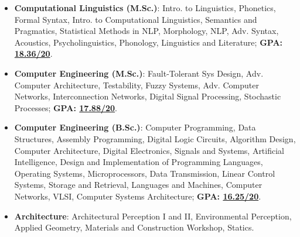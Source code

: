 \documentclass[10pt,a4paper,ragged2e]{altacv}
\begin{document}
    \begin{itemize}
        \item {\textbf{Computational Linguistics (M.Sc.)}: {Intro. to Linguistics, Phonetics, Formal Syntax, Intro. to Computational Linguistics, Semantics and Pragmatics, Statistical Methods in NLP, Morphology, NLP, Adv. Syntax, Acoustics, Psycholinguistics, Phonology, Linguistics and Literature; \textbf{GPA: \href{https://mavaji.github.io/assets/docs/cl-grades.pdf}{18.36/20}}.}}
        \item {\textbf{Computer Engineering (M.Sc.)}: {Fault-Tolerant Sys Design, Adv. Computer Architecture, Testability, Fuzzy Systems, Adv. Computer Networks, Interconnection Networks, Digital Signal Processing, Stochastic Processes; \textbf{GPA: \href{https://mavaji.github.io/assets/docs/ce-grades.pdf}{17.88/20}}.}}
        \item {\textbf{Computer Engineering (B.Sc.)}: {Computer Programming, Data Structures, Assembly Programming, Digital Logic Circuits, Algorithm Design, Computer Architecture, Digital Electronics, Signals and Systems, Artificial Intelligence, Design and Implementation of Programming Languages, Operating Systems, Microprocessors, Data Transmission, Linear Control Systems, Storage and Retrieval, Languages and Machines, Computer Networks, VLSI, Computer Systems Architecture; \textbf{GPA: \href{https://mavaji.github.io/assets/docs/iust-grades.pdf}{16.25/20}}.}}
        \item {\textbf{Architecture}: {Architectural Perception I and II, Environmental Perception, Applied Geometry, Materials and Construction Workshop, Statics.}}
    \end{itemize}


\end{document}

